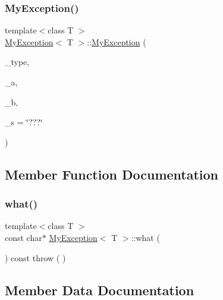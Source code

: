 \subsubsection{\texorpdfstring{MyException()}{MyException()}}
{\footnotesize\ttfamily template$<$class T $>$ \\
\mbox{\hyperlink{class_my_exception}{My\+Exception}}$<$ T $>$\+::\mbox{\hyperlink{class_my_exception}{My\+Exception}} (\begin{DoxyParamCaption}\item[{\mbox{\hyperlink{utils_8hh_af26a5d951fd6ab4b44e6cd8425aa0383}{E\+X\+C\+E\+P\+T\+I\+O\+N\+\_\+\+T\+Y\+PE}}}]{\+\_\+type,  }\item[{T}]{\+\_\+a,  }\item[{\mbox{\hyperlink{draw_8hh_aa620a13339ac3a1177c86edc549fda9b}{int}}}]{\+\_\+b,  }\item[{string}]{\+\_\+s = {\ttfamily \char`\"{}???\char`\"{}} }\end{DoxyParamCaption})\hspace{0.3cm}{\ttfamily [inline]}}



\subsection{Member Function Documentation}
\mbox{\label{class_my_exception_ad0a4ef3c9897eb136fa37aec342406fd}} 
\subsubsection{\texorpdfstring{what()}{what()}}
{\footnotesize\ttfamily template$<$class T $>$ \\
const char$\ast$ \mbox{\hyperlink{class_my_exception}{My\+Exception}}$<$ T $>$\+::what (\begin{DoxyParamCaption}{ }\end{DoxyParamCaption}) const throw ( ) \hspace{0.3cm}{\ttfamily [inline]}}



\subsection{Member Data Documentation}
\mbox{\label{class_my_exception_ae4b514f28c88dc08e7a27bc04f3b4655}} 
